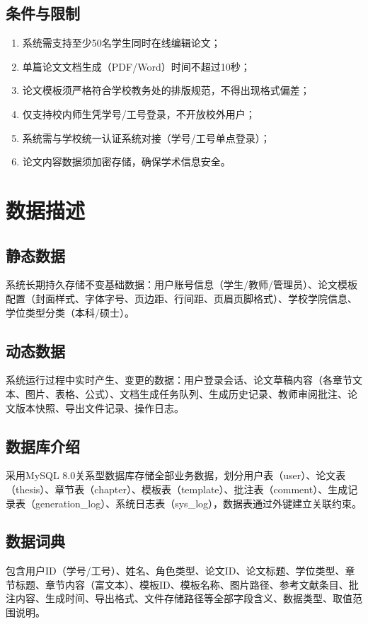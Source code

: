 \documentclass{../template/softeng}
\begin{document}
\subsection{条件与限制}
\begin{enumerate}
    \item 系统需支持至少50名学生同时在线编辑论文；
    \item 单篇论文文档生成（PDF/Word）时间不超过10秒；
    \item 论文模板须严格符合学校教务处的排版规范，不得出现格式偏差；
    \item 仅支持校内师生凭学号/工号登录，不开放校外用户；
    \item 系统需与学校统一认证系统对接（学号/工号单点登录）；
    \item 论文内容数据须加密存储，确保学术信息安全。
\end{enumerate}

\section{数据描述}
\subsection{静态数据}
系统长期持久存储不变基础数据：用户账号信息（学生/教师/管理员）、论文模板配置（封面样式、字体字号、页边距、行间距、页眉页脚格式）、学校学院信息、学位类型分类（本科/硕士）。

\subsection{动态数据}
系统运行过程中实时产生、变更的数据：用户登录会话、论文草稿内容（各章节文本、图片、表格、公式）、文档生成任务队列、生成历史记录、教师审阅批注、论文版本快照、导出文件记录、操作日志。

\subsection{数据库介绍}
采用MySQL 8.0关系型数据库存储全部业务数据，划分用户表（user）、论文表（thesis）、章节表（chapter）、模板表（template）、批注表（comment）、生成记录表（generation\_log）、系统日志表（sys\_log），数据表通过外键建立关联约束。

\subsection{数据词典}
包含用户ID（学号/工号）、姓名、角色类型、论文ID、论文标题、学位类型、章节标题、章节内容（富文本）、模板ID、模板名称、图片路径、参考文献条目、批注内容、生成时间、导出格式、文件存储路径等全部字段含义、数据类型、取值范围说明。
\end{document}
